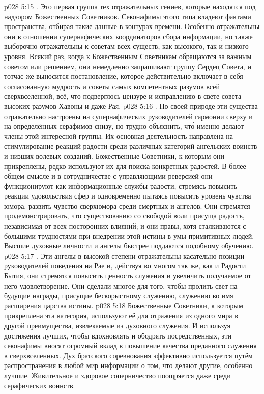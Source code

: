 \vs p028 5:15 . Это первая группа тех отражательных гениев, которые находятся под надзором Божественных Советников. Секонафимы этого типа владеют фактами пространства, отбирая такие данные в контурах времени. Особенно отражательны они в отношении супернафических координаторов сбора информации, но также выборочно отражательны к советам всех существ, как высокого, так и низкого уровня. Всякий раз, когда к Божественным Советникам обращаются за важным советом или решением, они немедленно запрашивают группу Сердец Совета, и тотчас же выносится постановление, которое действительно включает в себя согласованную мудрость и советы самых компетентных разумов всей сверхвселенной, всё, что подверглось цензуре и исправлению в свете совета высоких разумов Хавоны и даже Рая.
\vs p028 5:16 . По своей природе эти существа отражательно настроены на супернафических руководителей гармонии сверху и на определённых серафимов снизу, но трудно объяснить, чт\'о именно делают члены этой интересной группы. Их основная деятельность направлена на стимулирование реакций радости среди различных категорий ангельских воинств и низших волевых созданий. Божественные Советники, к которым они прикреплены, редко используют их для поиска конкретных радостей. В более общем смысле и в сотрудничестве с управляющими реверсией они функционируют как информационные службы радости, стремясь повысить реакции удовольствия сфер и одновременно пытаясь повысить уровень чувства юмора, развить чувство сверхюмора среди смертных и ангелов. Они стремятся продемонстрировать, что существованию со свободой воли присуща радость, независимая от всех посторонних влияний; и они правы, хотя сталкиваются с большими трудностями при внедрении этой истины в умы примитивных людей. Высшие духовные личности и ангелы быстрее поддаются подобному обучению.
\vs p028 5:17 . Эти ангелы в высокой степени отражательны касательно позиции руководителей поведения на Рае и, действуя во многом так же, как и Радости Бытия, они стремятся повысить ценность служения и увеличить получаемое от него удовлетворение. Они сделали многое для того, чтобы пролить свет на будущие награды, присущие бескорыстному служению, служению во имя расширения царства истины.
\vs p028 5:18 Божественные Советники, к которым прикреплена эта категория, используют её для отражения из одного мира в другой преимущества, извлекаемые из духовного служения. И используя достижения лучших, чтобы вдохновлять и ободрять посредственных, эти секонафимы вносят огромный вклад в повышение качества преданного служения в сверхвселенных. Дух братского соревнования эффективно используется путём распространения в любой мир информации о том, что делают другие, особенно лучшие. Живительное и здоровое соперничество поощряется даже среди серафических воинств.
